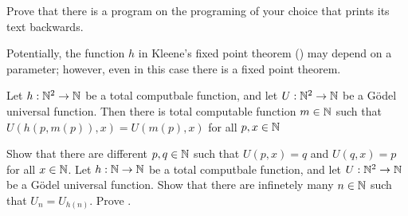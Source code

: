 \begin{exercise}
  Prove that there is a program on the programing of your choice that prints its
  text backwards.
\end{exercise}

Potentially, the function $h$ in Kleene's fixed point theorem
() may depend on a parameter; however, even in this case
there is a fixed point theorem.
\begin{theorem}
\label{theorem:kleene-parameter}
  Let $h : {\mathbb{N}}^2 \to {\mathbb{N}}$ be a total computbale function, and let $U : {\mathbb{N}}^2 \to {\mathbb{N}}$
  be a G\"odel universal function. Then there is total computable function $m
  \in {\mathbb{N}}$ such that $U(h(p, m(p)), x) = U(m(p), x)$ for all $p, x \in {\mathbb{N}}$
\end{theorem}

\begin{chapterendexercises}
  \exercise Show that there are different $p, q \in {\mathbb{N}}$ such that $U(p, x) = q$
    and $U(q, x) = p$ for all $x \in {\mathbb{N}}$.
  \exercise Let $h : {\mathbb{N}} \to {\mathbb{N}}$ be a total computbale function, and let 
    $U : {\mathbb{N}}^2 \to {\mathbb{N}}$ be a G\"odel universal function. Show that
    there are infinetely many $n \in {\mathbb{N}}$ such that $U_n = U_{h(n)}$.
  \exercise Prove .

\end{chapterendexercises}
